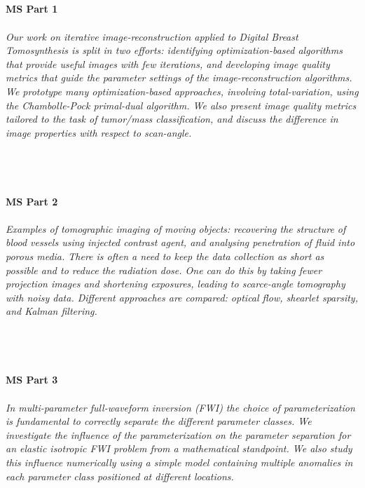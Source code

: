 \begin{multicols}{2}
\\ 
    \\
    \\\\
    \noindent\textbf{MS Part 1}\\
\\  
    \textit{Our work on iterative image-reconstruction applied to Digital Breast Tomosynthesis is split in two efforts:  identifying optimization-based algorithms that provide useful images with few iterations, and developing image quality metrics that guide the parameter settings of the image-reconstruction algorithms. We prototype many optimization-based approaches, involving total-variation, using the Chambolle-Pock primal-dual algorithm. We also present image quality metrics tailored to the task of tumor/mass classification, and discuss the difference in image properties with respect to scan-angle.}\\
\\ 
    \\
    \\\\
    \noindent\textbf{MS Part 2}\\
\\  
    \textit{Examples of tomographic imaging of moving objects: recovering the structure of blood vessels using injected contrast agent, and analysing penetration of fluid into porous media. There is often a need to keep the data collection as short as possible and to reduce the radiation dose. One can do this by taking fewer projection images and shortening exposures, leading to scarce-angle tomography with noisy data. Different approaches are compared: optical flow, shearlet sparsity, and Kalman filtering.}\\
\\ 
    \\
    \\\\
    \noindent\textbf{MS Part 3}\\
\\  
    \textit{In multi-parameter full-waveform inversion (FWI) the choice of parameterization is fundamental to correctly separate the different parameter classes. We investigate the influence of the parameterization on the parameter separation for an elastic isotropic FWI problem from a mathematical standpoint. We also study this influence numerically using a simple model containing multiple anomalies in each parameter class positioned at different locations.}\\

\end{multicols}
